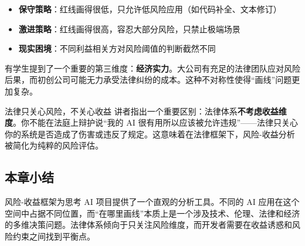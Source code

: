\begin{itemize}
    \item \textbf{保守策略}：红线画得很低，只允许低风险应用（如代码补全、文本修订）
    \item \textbf{激进策略}：红线画得很高，容忍大部分风险，只禁止极端场景
    \item \textbf{现实困境}：不同利益相关方对风险阈值的判断截然不同
\end{itemize}

有学生提到了一个重要的第三维度：\textbf{经济实力}。大公司有充足的法律团队应对风险后果，而初创公司可能无力承受法律纠纷的成本。这种不对称性使得``画线''问题更加复杂。

\begin{knowledgebox}{法律只关心风险，不关心收益}
讲者指出一个重要区别：法律体系\textbf{不考虑收益维度}。你不能在法庭上辩护说``我的 AI 很有用所以应该被允许违规''——法律只关心你的系统是否造成了伤害或违反了规定。这意味着在法律框架下，风险-收益分析被简化为纯粹的风险评估。
\end{knowledgebox}

\subsection{本章小结}

风险-收益框架为思考 AI 项目提供了一个直观的分析工具。不同的 AI 应用在这个空间中占据不同位置，而``在哪里画线''本质上是一个涉及技术、伦理、法律和经济的多维决策问题。法律体系倾向于只关注风险维度，而开发者需要在收益诱惑和风险约束之间找到平衡点。

